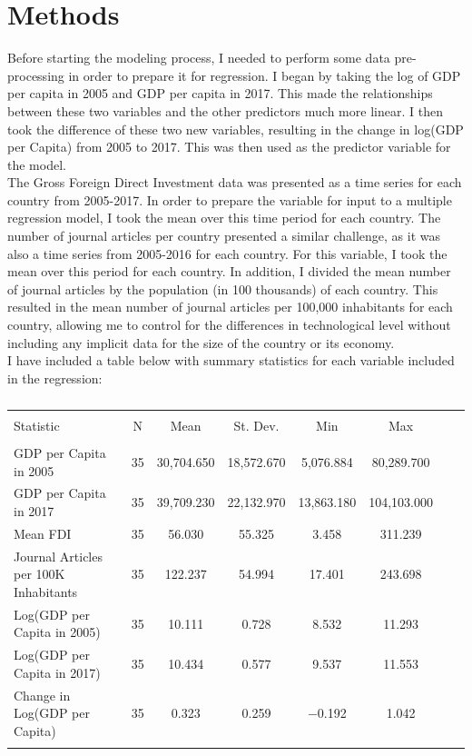 \documentclass{article}
\begin{document}
\section{Methods}
\quad Before starting the modeling process, I needed to perform some data pre-processing in order to prepare it for regression. I began by taking the log of GDP per capita in 2005 and GDP per capita in 2017. This made the relationships between these two variables and the other predictors much more linear. I then took the difference of these two new variables, resulting in the change in log(GDP per Capita) from 2005 to 2017. This was then used as the predictor variable for the model.\\
\null\quad The Gross Foreign Direct Investment data was presented as a time series for each country from 2005-2017. In order to prepare the variable for input to a multiple regression model, I took the mean over this time period for each country. The number of journal articles per country presented a similar challenge, as it was also a time series from 2005-2016 for each country. For this variable, I took the mean over this period for each country. In addition, I divided the mean number of journal articles by the population (in 100 thousands) of each country. This resulted in the mean number of journal articles per 100,000 inhabitants for each country, allowing me to control for the differences in technological level without including any implicit data for the size of the country or its economy.\\
\null\quad I have included a table below with summary statistics for each variable included in the regression:
\begin{table}[!htbp] \centering 
  \caption{} 
  \label{} 
\begin{tabular}{@{\extracolsep{5pt}}lccccccc} 
\\[-1.8ex]\hline 
\hline \\[-1.8ex] 
Statistic & \multicolumn{1}{c}{N} & \multicolumn{1}{c}{Mean} & \multicolumn{1}{c}{St. Dev.} & \multicolumn{1}{c}{Min} & \multicolumn{1}{c}{Max} \\ 
\hline \\[-1.8ex] 
GDP per Capita in 2005 & 35 & 30,704.650 & 18,572.670 & 5,076.884 & 80,289.700 \\ 
GDP per Capita in 2017 & 35 & 39,709.230 & 22,132.970 & 13,863.180 & 104,103.000 \\ 
Mean FDI & 35 & 56.030 & 55.325 & 3.458 & 311.239 \\ 
Journal Articles per 100K Inhabitants & 35 & 122.237 & 54.994 & 17.401 & 243.698 \\ 
Log(GDP per Capita in 2005) & 35 & 10.111 & 0.728 & 8.532 & 11.293 \\ 
Log(GDP per Capita in 2017) & 35 & 10.434 & 0.577 & 9.537 & 11.553 \\ 
Change in Log(GDP per Capita) & 35 & 0.323 & 0.259 & $-$0.192 & 1.042 \\ 
\hline \\[-1.8ex] 
\end{tabular} 
\end{table}
\end{document}
